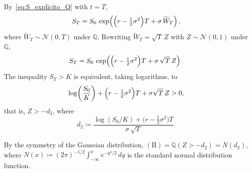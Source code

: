 \documentclass[11pt,a4paper,oneside]{report}
\theoremstyle{plain}
\theoremstyle{definition}
\theoremstyle{remark}
\newcommand{\Q}{\mathbb{Q}}
\newcommand{\1}{\mathbf{1}}
\newcommand{\eqdef}{\coloneqq}
\begin{document}
By~\eqref{eq:S_explicito_Q} with $t = T$,
\begin{equation}\label{eq:S_T_Q}
  S_T = S_0\, \exp\!\left(\Bigl(r - \tfrac{1}{2}\sigma^2\Bigr) T
                          + \sigma\, \widetilde W_T\right),
\end{equation}
where $\widetilde W_T \sim \mathcal{N}(0, T)$ under $\Q$. Rewriting
$\widetilde W_T = \sqrt{T}\, Z$ with $Z \sim \mathcal{N}(0, 1)$ under
$\Q$,
\begin{equation*}
  S_T = S_0\, \exp\!\left(\Bigl(r - \tfrac{1}{2}\sigma^2\Bigr) T
                          + \sigma\, \sqrt{T}\, Z\right).
\end{equation*}
The inequality $S_T > K$ is equivalent, taking logarithms, to
\begin{equation*}
  \log\!\left(\frac{S_0}{K}\right)
  + \Bigl(r - \tfrac{1}{2}\sigma^2\Bigr) T
  + \sigma\sqrt{T}\, Z > 0,
\end{equation*}
that is, $Z > -d_2$, where
\begin{equation}\label{eq:def_d2}
  d_2 \eqdef \frac{\log(S_0/K) + \bigl(r - \tfrac{1}{2}\sigma^2\bigr) T}
                  {\sigma\, \sqrt{T}}.
\end{equation}

By the
symmetry of the Gaussian distribution,
$(\mathrm{II}) = \Q(Z > -d_2) = N(d_2)$, where
$N(x) \eqdef (2\pi)^{-1/2} \int_{-\infty}^x e^{-y^2/2}\, dy$ is the
standard normal distribution function.
\end{document}

